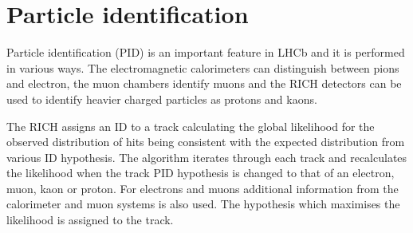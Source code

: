 \section{Particle identification}
\label{sec:PID_perf}

Particle identification (PID) is an important feature in LHCb and it is performed in various ways.
The electromagnetic calorimeters can distinguish between pions and electron, the muon chambers
identify muons and the RICH detectors can be used to identify 
heavier charged particles as protons and kaons.

The RICH assigns an ID to a track calculating the global likelihood for the observed distribution 
of hits being consistent with the expected distribution from various ID hypothesis.
The algorithm iterates through each track and recalculates the likelihood when the track PID hypothesis
is changed to that of an electron, muon, kaon or proton. For electrons and muons additional information
from the calorimeter and muon systems is also used. The hypothesis which maximises the likelihood
is assigned to the track.

